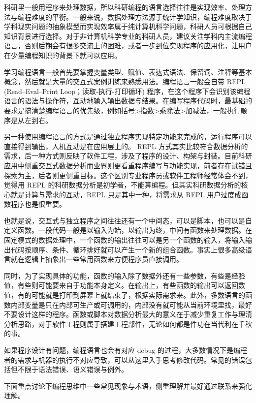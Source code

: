 \documentclass[]{tufte-book}
\begin{document}
科研里一般用程序来处理数据，所以科研编程的语言选择往往是实现效率、处理方法与编程难度的平衡。一般来说，数据处理方法源于统计学知识，编程难度取决于学科现实问题的抽象模型而实现效率属于纯计算机科学问题，科研人员可根据自己知识背景进行选择。对于非计算机科学专业的科研人员，建议关注学科内主流编程语言，否则后期会有很多交流上的困难，或者一步到位实现程序的应用化，让用户在少量编程知识的背景下就可以应用。

学习编程语言一般首先要掌握变量类型、赋值、表达式语法、保留词、注释等基本概念，然后就是大量的交互式案例训练来熟悉用法。编程语言一般会自带 REPL (Read--Eval--Print Loop；读取-执行-打印循环) 程序，在这个程序下会识别该编程语言的语法与操作符，互动地输入输出数据与结果。在编写程序代码时，最基础的要求是搞清楚编程语言的优先级，例如括号\textgreater 指数\textgreater 乘除法\textgreater 加减法，一般执行顺序是从左到右。

另一种使用编程语言的方式是通过独立程序实现特定功能来完成的，运行程序可以直接得到输出，人机互动是在应用层上的。 REPL 方式其实比较符合数据分析的需求，后一种方式则反映了软件工程，涉及了程序的设计、构架与封装。目前科研应用中侧重交互式数据分析而业界则更看重程序编写与功能实现，前者存在试错且探索为主，后者则更侧重目标。这个区别专业程序员或软件工程师经常体会不到，觉得用 REPL 的科研数据分析是初学者，不能算编程。但其实科研数据分析的核心就是计算与需求的互动，REPL 只是其中一种，将需求从 REPL 用户过度成函数程序也是很重要。

也就是说，交互式与独立程序之间往往还有一个中间态，可以是脚本，也可以是自定义函数。一段代码一般是以输入为始，以输出为终，中间有函数来处理数据。在固定模式的数据处理中，一个函数的输出往往可以是另一个函数的输入，将输入输出代码按顺序、条件、循环排好就可以产生一个新的组合函数。事实上很多高级语言就在逻辑上抽象出一些常用函数来方便程序员直接调用。

同时，为了实现具体的功能，函数的输入除了数据外还有一些参数，有些是经验值，有些则可能要来自于功能本身定义。在输出上，有些函数的输出可以返回数值，有的可能就是打印到屏幕上就结束了，根据实际需求来。此外，多数语言的函数内部变量是只在内部可生产或可调用的，内部没有就可能从当前环境里找，最好不要设计这样的程序。函数或脚本对数据分析最大的意义在于减少重复工作与理清分析思路，对于软件工程则属于搭建工程部件，无论如何都是件功在当代利在千秋的事。

如果程序设计有问题，编程语言也会有对应 debug 的过程，大多数情况下是编程者的需求与机器的执行不对应导致，可以从这里入手思考修改代码。常见的错误包括但不限于语法错误、语义错误与例外。

下面重点讨论下编程思维中一些常见现象与术语，侧重理解并最好通过联系来强化理解。
\end{document}
